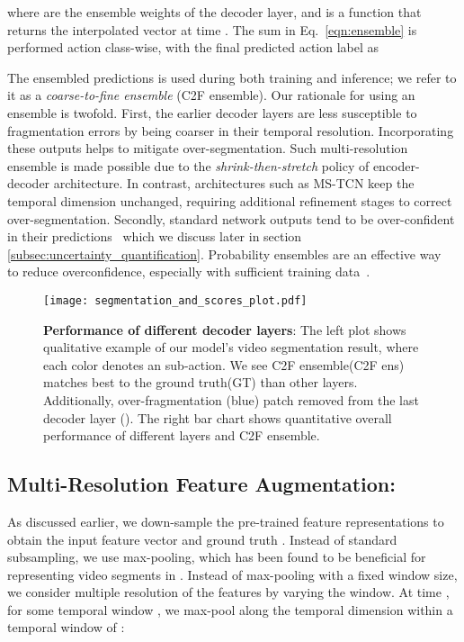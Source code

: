 \documentclass[10pt,twocolumn,letterpaper]{article}
\begin{document}
where  are the ensemble weights of the  decoder layer, and  is a function that returns the interpolated vector at time . The sum in Eq.~\ref{eqn:ensemble} is performed action class-wise, with the final predicted action label as


The ensembled predictions  is used during both training and inference; we refer to it as a \textit{coarse-to-fine ensemble} (C2F ensemble). Our rationale for using an ensemble is twofold. First, the earlier decoder layers are less susceptible to fragmentation errors by being coarser in their temporal resolution. Incorporating these outputs helps to mitigate over-segmentation. Such multi-resolution ensemble is made possible due to the \textit{shrink-then-stretch} policy of encoder-decoder architecture. In contrast, architectures such as MS-TCN keep the temporal dimension unchanged, requiring additional refinement stages to correct over-segmentation. 
Secondly, standard network outputs tend to be over-confident in their predictions~\cite{Guo_calibration_2017} which we discuss later in section \ref{subsec:uncertainty_quantification}.  Probability ensembles are an effective way~\cite{DeepEnsemble, lee2015m} to reduce overconfidence, especially with sufficient training data~\cite{rahaman2020uncertainty}. 

\begin{figure*}
\begin{center}
\texttt{[image: segmentation\_and\_scores\_plot.pdf]}
\end{center}
\caption{\textbf{Performance of different decoder layers}: The left plot shows qualitative example of our model's video segmentation result, where each color denotes an sub-action. We see C2F ensemble(C2F ens) matches best to the ground truth(GT) than other layers. Additionally, over-fragmentation (blue) patch removed from the last decoder layer (). The right bar chart shows quantitative overall performance of different layers and C2F ensemble.}
\label{fig:layer-analysis}
\end{figure*}

\subsection{Multi-Resolution Feature Augmentation:}\label{subsec:augmentation}
As discussed earlier, we down-sample the pre-trained feature representations  to obtain the input feature vector  and ground truth . Instead of standard subsampling, we use max-pooling, which has been found to be beneficial for representing video segments in \cite{sener2020temporal}. Instead of max-pooling with a fixed window size, we consider multiple resolution of the features by varying the window. At time , for some temporal window , we max-pool along the temporal dimension within a temporal window of : 
\end{document}
